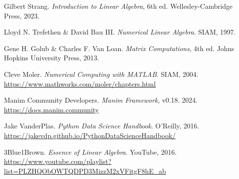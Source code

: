 \documentclass[12pt]{article}
\begin{document}
\begin{enumerate}[label={[\arabic*]}, leftmargin=1.5cm]
    \item Gilbert Strang. \textit{Introduction to Linear Algebra}, 6th ed. Wellesley-Cambridge Press, 2023.
    \item Lloyd N. Trefethen \& David Bau III. \textit{Numerical Linear Algebra}. SIAM, 1997.
    \item Gene H. Golub \& Charles F. Van Loan. \textit{Matrix Computations}, 4th ed. Johns Hopkins University Press, 2013.
    \item Cleve Moler. \textit{Numerical Computing with MATLAB}. SIAM, 2004. \\ \url{https://www.mathworks.com/moler/chapters.html}
    \item Manim Community Developers. \textit{Manim Framework}, v0.18. 2024. \\ \url{https://docs.manim.community}
    \item Jake VanderPlas. \textit{Python Data Science Handbook}. O’Reilly, 2016. \\ \url{https://jakevdp.github.io/PythonDataScienceHandbook/}
    \item 3Blue1Brown. \textit{Essence of Linear Algebra}. YouTube, 2016. \\ \url{https://www.youtube.com/playlist?list=PLZHQObOWTQDPD3MizzM2xVFitgF8hE_ab}
\end{enumerate}
\end{document}
